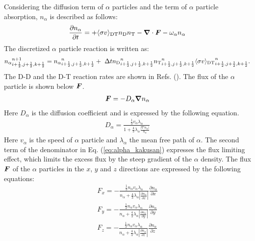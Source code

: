 \begin{enumerate}
Considering the diffusion term of $ \alpha $ particles and the term of $ \alpha $ particle absorption, $ n_\alpha $ is described as follows: 
		\begin{equation}
	\label{eq:alphaReac}
		\frac{\partial n_\alpha}{\partial t}=+\langle\sigma v\rangle_{\rm DT}n_{\rm D}n_{\rm T}-\bm\nabla\cdot\bm F-\omega_\alpha n_\alpha
	\end{equation}
	The discretized $\alpha$ particle reaction is written as: 
	\begin{equation}
		{n_\alpha}^{n+1}_{i+\frac{1}{2},j+\frac{1}{2},k+\frac{1}{2}}={n_\alpha}^{n}_{i+\frac{1}{2},j+\frac{1}{2},k+\frac{1}{2}}+\ \Delta t{n_{\rm D}}^{n}_{i+\frac{1}{2},j+\frac{1}{2},k+\frac{1}{2}}{n_{\rm T}}^{n}_{i+\frac{1}{2},j+\frac{1}{2},k+\frac{1}{2}}\langle\sigma v{\rangle_{\rm DT}}^{n}_{i+\frac{1}{2},j+\frac{1}{2},k+\frac{1}{2}}.
	\end{equation}
The D-D and the D-T reaction rates are shown in Refs. (\cite {CPC-O-SUKI, NRLpf}).	
The flux of the $\alpha$ particle is shown below $\mbox{\boldmath $F$}$.
\begin{eqnarray}
\mbox{\boldmath $F$}  = - D_\alpha \mbox{\boldmath $\nabla$} n_\alpha
\end{eqnarray}
Here $D_\alpha$ is the diffusion coefficient and is expressed by the following equation.
\begin{eqnarray}
\label{eq:alpha_kakusan}
D_\alpha = \frac{ \frac{1}{3} v_\alpha \lambda_\alpha}{1+ \frac{4}{3} \lambda_\alpha \frac{|\nabla n_\alpha|}{n_\alpha}}
\end{eqnarray}
Here $v_\alpha$ is the speed of $\alpha$ particle and $\lambda_\alpha$ the mean free path of $\alpha$. The second term of the denominator in Eq. (\ref{eq:alpha_kakusan}) expresses the flux limiting effect, which limits the excess flux by the steep gradient of the $\alpha$ density. The flux $\mbox{\boldmath $F$}$ of the $\alpha$ particles in the $x$, $y$ and $z$ directions are expressed by the following equations:  
\begin{eqnarray}
F_x = - \frac{ \frac{1}{3} n_\alpha v_\alpha \lambda_\alpha }{n_\alpha + \frac{4}{3} \lambda_\alpha \left| \frac{\partial n_\alpha}{\partial x} \right| } \frac{\partial n_\alpha}{\partial x} \\
F_y = - \frac{ \frac{1}{3} n_\alpha v_\alpha \lambda_\alpha }{n_\alpha + \frac{4}{3} \lambda_\alpha \left| \frac{\partial n_\alpha}{\partial y} \right| } \frac{\partial n_\alpha}{\partial y} \\
F_z = - \frac{ \frac{1}{3} n_\alpha v_\alpha \lambda_\alpha }{n_\alpha + \frac{4}{3} \lambda_\alpha \left| \frac{\partial n_\alpha}{\partial z} \right| } \frac{\partial n_\alpha}{\partial z} 
\end{eqnarray}
	

\end{enumerate}
